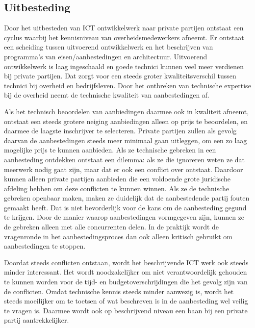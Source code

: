 \documentclass[10pt]{article}   	%
\begin{document}
\begin{multicols}{2}
\section{Uitbesteding}

Door het uitbesteden van ICT ontwikkelwerk naar private partijen ontstaat een cyclus waarbij
het kennisniveau van overheidsmedewerkers afneemt. Er ontstaat een scheiding tussen 
uitvoerend ontwikkelwerk en het beschrijven van programma's van eisen/aanbestedingen en architectuur.  
Uitvoerend ontwikkelwerk is laag ingeschaald en goede technici kunnen veel meer verdienen bij 
private partijen. Dat zorgt voor een steeds groter kwaliteitsverschil tussen technici bij 
overheid en bedrijfsleven. Door het ontbreken van technische expertise bij de overheid neemt de
technische kwaliteit van aanbestedingen af. 

Als het technisch beoordelen van aanbiedingen daarmee
ook in kwaliteit afneemt, ontstaat een steeds grotere neiging aanbiedingen alleen op prijs te 
beoordelen, en daarmee de laagste inschrijver te selecteren. Private partijen zullen als gevolg daarvan 
de aanbestedingen steeds meer minimaal gaan uitleggen, om een zo laag mogelijke prijs te kunnen
aanbieden. Als ze technische gebreken in een aanbesteding ontdekken ontstaat een dilemma:
als ze die ignoreren weten ze dat meerwerk nodig gaat zijn, maar dat er ook een conflict over 
ontstaat. Daardoor kunnen alleen private partijen aanbieden die een voldoende grote juridische
afdeling hebben om deze conflicten te kunnen winnen. Als ze de technische gebreken openbaar maken,
maken ze duidelijk dat de aanbestedende partij fouten gemaakt heeft. Dat is niet bevorderlijk voor
de kans om de aanbesteding gegund te krijgen. Door de manier waarop aanbestedingen vormgegeven
zijn, kunnen ze de gebreken alleen met alle concurrenten delen. In de praktijk wordt de vragenronde
in het aanbestedingsproces dan ook alleen kritisch gebruikt om aanbestedingen te stoppen.  

Doordat steeds conflicten ontstaan, wordt het beschrijvende ICT werk ook steeds minder interessant. 
Het wordt noodzakelijker om niet verantwoordelijk gehouden te kunnen worden voor de tijd- en
budgetoverschrijdingen die het gevolg zijn van de conflicten. Omdat technische kennis steeds minder
aanwezig is, wordt het steeds moeilijker om te toetsen of wat beschreven is in de aanbesteding wel
veilig te vragen is. Daarmee wordt ook op beschrijvend niveau een baan bij een private partij aantrekkelijker.


\end{multicols}
\end{document}
